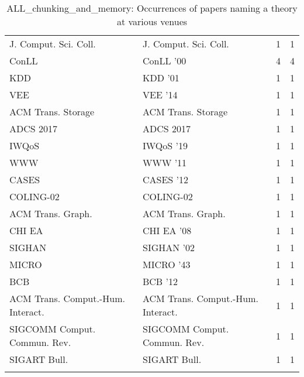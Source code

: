 \begin{table*}[t]
\begin{tabular}{llrr}
\multirow{1}{*}{J. Comput. Sci. Coll.} & J. Comput. Sci. Coll. & 1 & \multirow{1}{*}{1}\\
\multirow{1}{*}{ConLL } & ConLL '00 & 4 & \multirow{1}{*}{4}\\
\multirow{1}{*}{KDD } & KDD '01 & 1 & \multirow{1}{*}{1}\\
\multirow{1}{*}{VEE } & VEE '14 & 1 & \multirow{1}{*}{1}\\
\multirow{1}{*}{ACM Trans. Storage} & ACM Trans. Storage & 1 & \multirow{1}{*}{1}\\
\multirow{1}{*}{ADCS 2017} & ADCS 2017 & 1 & \multirow{1}{*}{1}\\
\multirow{1}{*}{IWQoS } & IWQoS '19 & 1 & \multirow{1}{*}{1}\\
\multirow{1}{*}{WWW } & WWW '11 & 1 & \multirow{1}{*}{1}\\
\multirow{1}{*}{CASES } & CASES '12 & 1 & \multirow{1}{*}{1}\\
\multirow{1}{*}{COLING-02} & COLING-02 & 1 & \multirow{1}{*}{1}\\
\multirow{1}{*}{ACM Trans. Graph.} & ACM Trans. Graph. & 1 & \multirow{1}{*}{1}\\
\multirow{1}{*}{CHI EA } & CHI EA '08 & 1 & \multirow{1}{*}{1}\\
\multirow{1}{*}{SIGHAN } & SIGHAN '02 & 1 & \multirow{1}{*}{1}\\
\multirow{1}{*}{MICRO } & MICRO '43 & 1 & \multirow{1}{*}{1}\\
\multirow{1}{*}{BCB } & BCB '12 & 1 & \multirow{1}{*}{1}\\
\multirow{1}{*}{ACM Trans. Comput.-Hum. Interact.} & ACM Trans. Comput.-Hum. Interact. & 1 & \multirow{1}{*}{1}\\
\multirow{1}{*}{SIGCOMM Comput. Commun. Rev.} & SIGCOMM Comput. Commun. Rev. & 1 & \multirow{1}{*}{1}\\
\multirow{1}{*}{SIGART Bull.} & SIGART Bull. & 1 & \multirow{1}{*}{1}\\
\caption{ALL_chunking_and_memory: Occurrences of papers naming a theory at various venues}
\end{tabular}
\end{table*}